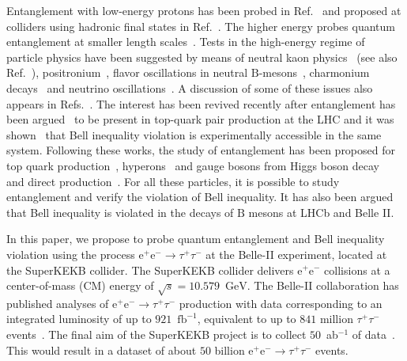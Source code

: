 \documentclass[a4paper,12pt,twocolumn]{article}
\numberwithin{equation}{section} %
\newcommand{\PB}{\ensuremath{\textrm{B}}\xspace}
\newcommand{\Pem}{\ensuremath{\textrm{e}^{-}}\xspace}
\newcommand{\Pep}{\ensuremath{\textrm{e}^{+}}\xspace}
\newcommand{\Pgtm}{\ensuremath{\tau^{-}}\xspace}
\newcommand{\Pgtp}{\ensuremath{\tau^{+}}\xspace}
\newcommand{\GeV}{\ensuremath{\textrm{GeV}}\xspace}
\newcommand{\fbinv}{\ensuremath{\textrm{fb}^{-1}}\xspace}
\begin{document}
Entanglement with low-energy protons has been probed in Ref.~\cite{Lamehi-Rachti:1976wey} and proposed at colliders using hadronic final states in Ref.~\cite{Tornqvist:1980af}.
The higher energy probes quantum entanglement at smaller length scales~\cite{Abel:1992kz}. 
Tests in the high-energy regime of particle physics have been suggested by means of neutral kaon physics~\cite{Benatti:1999jt,Bertlmann:2001ea} (see also Ref.~\cite{Banerjee:2014vga}), positronium~\cite{Acin:2000cs}, flavor oscillations in neutral $\PB$-mesons~\cite{Go:2003tx}, charmonium decays~\cite{Baranov:2008zzb} and neutrino oscillations~\cite{Banerjee:2015mha}.
A discussion of some of these issues also appears in Refs.~\cite{Yongram:2013soa,Cervera-Lierta:2017tdt}. 
The interest has been revived recently after entanglement has been argued~\cite{Afik:2020onf} to be present in top-quark pair production at the LHC and it was shown~\cite{Fabbrichesi:2021npl} that Bell inequality violation is experimentally accessible in the same system. Following these works, the study of entanglement has been proposed for top quark production~\cite{Severi:2021cnj,Larkoski:2022lmv,Aguilar-Saavedra:2022uye,Afik:2022dgh,Afik:2022kwm}, hyperons~\cite{Gong:2021bcp} and gauge bosons from Higgs boson decay~\cite{Barr:2021zcp,Aguilar-Saavedra:2022wam,Ashby-Pickering:2022umy,Fabbrichesi:2023cev} and direct production~\cite{Ashby-Pickering:2022umy,Fabbrichesi:2023cev}. 
For all these particles, it is possible to study entanglement and verify the violation of Bell inequality. It has also been argued~\cite{Fabbrichesi:2023idl} that Bell inequality is violated in the decays of $\PB$ mesons at LHCb and Belle II.

In this paper, we propose to probe quantum entanglement and Bell inequality violation using the process $\Pep\Pem \to \Pgtp\Pgtm$ at the Belle-II experiment, located at the SuperKEKB collider. The SuperKEKB collider delivers $\Pep\Pem$ collisions at a center-of-mass (CM) energy of $\sqrt{s} = 10.579$~\GeV. The Belle-II collaboration has published analyses of $\Pep\Pem \to \Pgtp\Pgtm$ production with data corresponding to an integrated luminosity of up to $921$~\fbinv, equivalent to up to $841$ million $\Pgtp\Pgtm$ events~\cite{Belle:2020lfn,Belle-II:2023izd}. 
The final aim of the SuperKEKB project is to collect $50$~ab$^{-1}$ of data~\cite{Akai:2018mbz,Belle-II:2018jsg}. This would result in a dataset of about $50$ billion $\Pep\Pem \to \Pgtp\Pgtm$ events.
\end{document}
